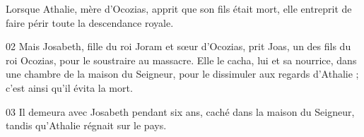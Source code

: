 Lorsque Athalie, mère d’Ocozias, apprit que son fils était mort, elle entreprit de faire périr toute la descendance royale.

02 Mais Josabeth, fille du roi Joram et sœur d’Ocozias, prit Joas, un des fils du roi Ocozias, pour le soustraire au massacre. Elle le cacha, lui et sa nourrice, dans une chambre de la maison du Seigneur, pour le dissimuler aux regards d’Athalie ; c’est ainsi qu’il évita la mort.

03 Il demeura avec Josabeth pendant six ans, caché dans la maison du Seigneur, tandis qu’Athalie régnait sur le pays.
